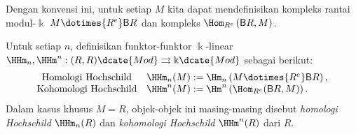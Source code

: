Dengan konvensi ini, untuk setiap $M$ kita dapat mendefinisikan kompleks
rantai modul-$\Bbbk$ $M\dotimes{R^e}\mathsf{B}R$ dan kompleks
$\Hom_{R^e}\left(\mathsf{B}R,M\right)$.

\begin{definisi}[G.\ Hochschild]\label{def:HH}
	Untuk setiap $n$, definisikan funktor-funktor $\Bbbk$-linear
	$\HHm_n,\HHm^n:(R,R)\dcate{Mod}\rightrightarrows\Bbbk\dcate{Mod}$
	sebagai berikut:
	\[\begin{array}{cl}
		\text{Homologi Hochschild}
		& \HHm_n(M) := \Hm_n\left(M\dotimes{R^e}\mathsf{B}R\right), \\
		\text{Kohomologi Hochschild}
		& \HHm^n(M) := \Hm^n\left(\Hom_{R^e}(\mathsf{B}R,M)\right).
	\end{array}\]
	Dalam kasus khusus $M=R$, objek-objek ini masing-masing disebut
	\emph{homologi Hochschild} $\HHm_n(R)$ dan \emph{kohomologi Hochschild}
	$\HHm^n(R)$ dari $R$.
\end{definisi}

